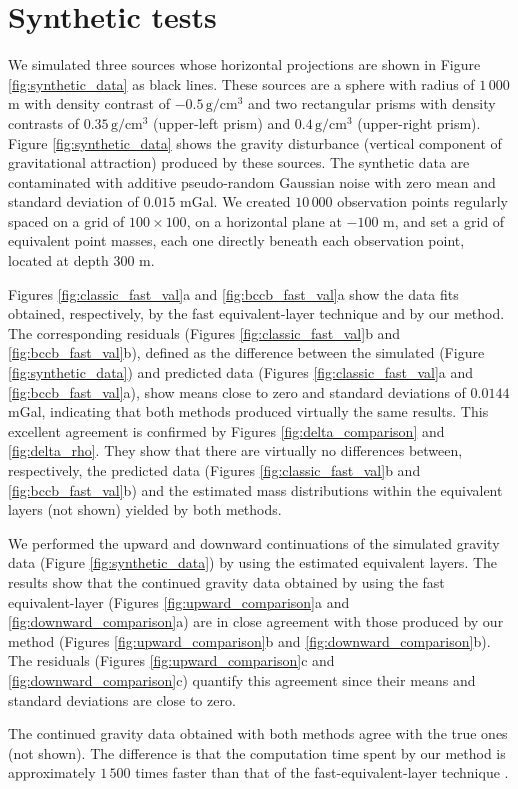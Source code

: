 \section{Synthetic tests}

We simulated three sources whose horizontal projections are shown in Figure \ref{fig:synthetic_data} as black lines. 
These sources are a sphere with radius of $1\,000$ m with density contrast of 
$-0.5\, \mathrm{g/cm^3}$ and two rectangular prisms with density contrasts of $0.35\, \mathrm{g/cm^3}$ (upper-left prism) 
and $0.4\, \mathrm{g/cm^3}$ (upper-right prism). 
Figure \ref{fig:synthetic_data} shows the gravity disturbance (vertical component of gravitational attraction) 
produced by these sources. The synthetic data are contaminated with additive pseudo-random Gaussian 
noise with zero mean and standard deviation of $0.015$ mGal.
We created $10\,000$ observation points regularly spaced on a grid of $100 \times 100$, on a 
horizontal plane at $-100$ m, and set a grid of equivalent point masses, each one directly beneath each 
observation point, located at depth $300$ m. 

Figures \ref{fig:classic_fast_val}a and \ref{fig:bccb_fast_val}a show the data fits 
obtained, respectively, by the fast equivalent-layer technique \citep{siqueira-etal2017} 
and by our method. The corresponding residuals (Figures \ref{fig:classic_fast_val}b 
and \ref{fig:bccb_fast_val}b), defined as the difference between the simulated (Figure \ref{fig:synthetic_data}) 
and predicted data (Figures \ref{fig:classic_fast_val}a and \ref{fig:bccb_fast_val}a), show means close to 
zero and standard deviations of $0.0144$ mGal, indicating that both methods produced virtually the same results.
This excellent agreement is confirmed by Figures \ref{fig:delta_comparison} and 
\ref{fig:delta_rho}. They show that there are virtually no differences between, respectively, 
the predicted data (Figures \ref{fig:classic_fast_val}b and \ref{fig:bccb_fast_val}b) and the 
estimated mass distributions within the equivalent layers (not shown) yielded by 
both methods. 

We performed the upward and downward continuations of the simulated gravity data 
(Figure \ref{fig:synthetic_data}) by using the estimated equivalent layers.
The results show that the continued gravity data obtained by using the 
fast equivalent-layer (Figures \ref{fig:upward_comparison}a and \ref{fig:downward_comparison}a) 
are in close agreement with those produced by our method (Figures \ref{fig:upward_comparison}b and 
\ref{fig:downward_comparison}b). The residuals (Figures \ref{fig:upward_comparison}c and \ref{fig:downward_comparison}c)
quantify this agreement since their means and standard deviations are close to zero. 

The continued gravity data obtained with both methods agree with the true ones (not shown).
The difference is that the computation time spent by our method is 
approximately $1\,500$ times faster than that of the fast-equivalent-layer 
technique \citep{siqueira-etal2017}. 